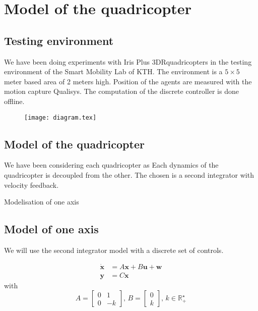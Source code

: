 \section{Model of the quadricopter}

\subsection{Testing environment}
We have been doing experiments with Iris Plus 3DR\trademark quadricopters in the testing environment of the Smart Mobility Lab of KTH.
The environment is a $5\times5$ meter based area of 2 meters high.
Position of the agents are measured with the motion capture Qualisys\trademark.
The computation of the discrete controller is done offline.

\begin{figure}
\texttt{[image: diagram.tex]}
\end{figure}

\subsection{Model of the quadricopter}
We have been considering each quadricopter as 
Each dynamics of the quadricopter is decoupled from the other.
The chosen is a second integrator with velocity feedback. 

Modelisation of one axis

\subsection{Model of one axis}
We will use the second integrator model with a discrete set of controls.

\begin{equation}\label{eqn:lin_sys}
\begin{split}
\dot{\mathbf{x}} &= A \mathbf{x} + B \mathbf{u} + \mathbf{w}\\
\mathbf{y} &= C\mathbf{x}
\end{split}
\end{equation}
with
\begin{equation*} \label{eqn:sec_int}
A = \begin{bmatrix}
0 & 1\\ 
0 & -k
\end{bmatrix}
\textrm{, }
B = \begin{bmatrix}
0 \\ 
k 
\end{bmatrix}
\textrm{, }
k \in \mathbb{R}_+^\star
\end{equation*}

